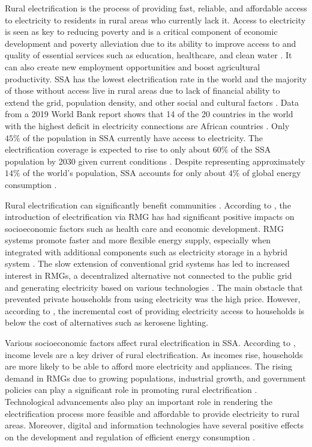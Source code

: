 Rural electrification is the process of providing fast, reliable, and affordable access to electricity to residents in rural areas who currently lack it. Access to electricity is seen as key to reducing poverty and is a critical component of economic development and poverty alleviation due to its ability to improve access to and quality of essential services such as education, healthcare, and clean water \cite{hussein2012analysis, hanjra2009reducing}. It can also create new employment opportunities and boost agricultural productivity. SSA has the lowest electrification rate in the world and the majority of those without access live in rural areas due to lack of financial ability to extend the grid, population density, and other social and cultural factors \cite{zebra2021review}. Data from a 2019 World Bank report shows that 14 of the 20 countries in the world with the highest deficit in electricity connections are African countries \cite{Tracking_SDG7_Report_2019}. Only $45\%$ of the population in SSA currently have access to electricity. The electrification coverage is expected to rise to only about $60\%$ of the SSA population by 2030 given current conditions \cite{valickova2021costs}. Despite representing approximately $14\%$ of the world's population, SSA accounts for only about $4\%$ of global energy consumption \cite{falk2021socio}.

Rural electrification can significantly benefit communities \cite{chakravorty2016lighting}. According to \cite{falk2021socio}, the introduction of electrification via RMG has had significant positive impacts on socioeconomic factors such as health care and economic development. RMG systems promote faster and more flexible energy supply, especially when integrated with additional components such as electricity storage in a hybrid system \cite{mazzeo2021literature}. The slow extension of conventional grid systems has led to increased interest in RMGs, a decentralized alternative not connected to the public grid and generating electricity based on various technologies \cite{korkovelos2020retrospective}. The main obstacle that prevented private households from using electricity was the high price. However, according to \cite{valickova2021costs}, the incremental cost of providing electricity access to households is below the cost of alternatives such as kerosene lighting.

Various socioeconomic factors affect rural electrification in SSA. According to \cite{poblete2021model}, income levels are a key driver of rural electrification. As incomes rise, households are more likely to be able to afford more electricity and appliances. The rising demand in RMGs due to growing populations, industrial growth, and government policies can play a significant role in promoting rural electrification \cite{antonanzas2021state}. Technological advancements also play an important role in rendering the electrification process more feasible and affordable to provide electricity to rural areas. Moreover, digital and information technologies have several positive effects on the development and regulation of efficient energy consumption \cite{shabalov2021influence, Consultant_Klooss_Consultant_2021}.

